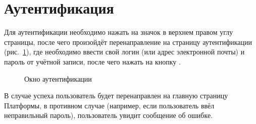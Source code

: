 \section{Аутентификация} \label{sec:authorization}
	Для аутентификации необходимо нажать на значок  в верхнем правом углу страницы, после чего произойдёт перенаправление на страницу аутентификации (рис.~\ref{img:authorization:authorization_page}), где необходимо ввести свой логин (или адрес электронной почты) и пароль от учётной записи, после чего нажать на кнопку .
	\begin{figure}[H]
		\caption{Окно аутентификации}
		\label{img:authorization:authorization_page}
	\end{figure}
	
	В случае успеха пользователь будет перенаправлен на главную страницу Платформы, в противном случае (например, если пользователь ввёл неправильный пароль), пользователь увидит сообщение об ошибке.